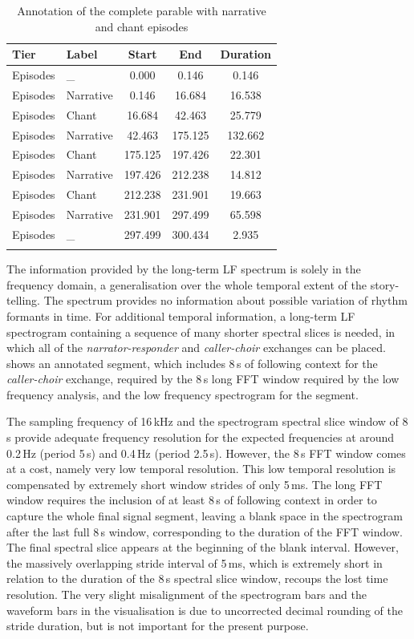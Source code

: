 \documentclass[output=paper,colorlinks,citecolor=brown]{langscibook}
\begin{document}
\begin{table}
\caption{Annotation of the complete parable with narrative and chant episodes}
\label{table:table02}
\begin{tabular}{ll *3{S[table-format=3.3]}}
\lsptoprule
Tier        & Label         & {Start} & {End} & {Duration}\\\midrule
Episodes	&	\_	        &	0.000	&	0.146	&	0.146\\
Episodes	&	Narrative	&	0.146	&	16.684	&	16.538\\
Episodes	&	Chant	&	16.684	&	42.463	&	25.779\\
Episodes	&	Narrative	&	42.463	&	175.125	&	132.662\\
Episodes	&	Chant	&	175.125	&	197.426	&	22.301\\
Episodes	&	Narrative	&	197.426	&	212.238	&	14.812\\
Episodes	&	Chant	&	212.238	&	231.901	&	19.663\\
Episodes	&	Narrative	&	231.901	&	297.499	&	65.598\\
Episodes	&	\_	&	297.499	&	300.434	&	2.935\\
\lspbottomrule
\end{tabular}
\end{table}

The information provided by the long-term LF spectrum is solely in the frequency domain, a generalisation over the whole temporal extent of the story-telling. The spectrum provides no information about possible variation of rhythm formants in time. For additional temporal information, a long-term LF spectrogram containing a sequence of many shorter spectral slices is needed, in which all of the \textit{narrator-responder} and \textit{caller-choir} exchanges can be placed.  shows an annotated segment, which includes 8\,s of following context for the \textit{caller-choir} exchange, required by the 8\,s long FFT window required by the low frequency analysis, and the low frequency spectrogram for the segment.

The sampling frequency of 16\,kHz and the spectrogram spectral slice window of 8\,s provide adequate frequency resolution for the expected frequencies at around 0.2\,Hz (period 5\,s) and 0.4\,Hz (period 2.5\,s). However, the 8\,s FFT window comes at a cost, namely very low temporal resolution. This low temporal resolution is compensated by extremely short window strides of only 5\,ms. The long FFT window requires the inclusion of at least 8\,s of following context in order to capture the whole final signal segment, leaving a blank space in the spectrogram after the last full 8\,s window, corresponding to the duration of the FFT window. The final spectral slice appears at the beginning of the blank interval. However, the massively overlapping stride interval of 5\,ms, which is extremely short in relation to the duration of the 8\,s spectral slice window, recoups the lost time resolution. The very slight misalignment of the spectrogram bars and the waveform bars in the visualisation is due to uncorrected decimal rounding of the stride duration, but is not important for the present purpose.
\end{document}

